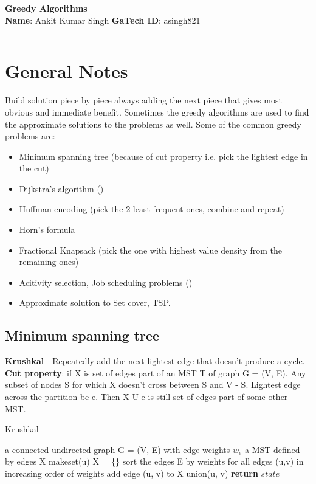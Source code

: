 \documentclass[11pt,letterpaper]{article}
\begin{document}
\pagestyle{plain}
 
\begin{center}
\textbf{\large Greedy Algorithms}\\
\textbf{Name}: Ankit Kumar Singh
\hspace{8cm}
\textbf{GaTech ID}: asingh821
\end{center}
\hrule

\section{General Notes}
Build solution piece by piece always adding the next piece that gives most obvious and immediate benefit. Sometimes the greedy algorithms are used to find the approximate solutions to the problems as well. Some of the common greedy problems are:
\begin{itemize}
	\item Minimum spanning tree (because of cut property i.e. pick the lightest edge in the cut)
	\item Dijkstra's algorithm ()
	\item Huffman encoding (pick the 2 least frequent ones, combine and repeat)
	\item Horn's formula
	\item Fractional Knapsack (pick the one with highest value density from the remaining ones)
	\item Acitivity selection, Job scheduling problems ()
	\item Approximate solution to Set cover, TSP. 
\end{itemize}

\subsection{Minimum spanning tree}

\textbf{Krushkal} - Repeatedly add the next lightest edge that doesn't produce a cycle.
\newline
\textbf{Cut property}: if X is set of edges part of an MST T of graph G = (V, E). Any subset of nodes S for which X doesn't cross between S and V - S. Lightest edge across the partition be e. Then X U {e} is still set of edges part of some other MST. 

\begin{algorithm}
	\algrenewcommand{}
	\algrenewcommand{}
	\caption{Krushkal}
	\label{alg: Krushkal's Minimum spanning tree}
	\begin{algorithmic}[1]
		\Require a connected undirected graph G = (V, E) with edge weights $w_{e}$
		\Ensure a MST defined by edges X
			\State makeset(u)
		\EndFor
		\State X = \{\}
		\State sort the edges E by weights
		\State for all edges (u,v) in increasing order of weights
			\State add edge (u, v) to X
			\State union(u, v)
		\EndIf
		\State \textbf{return} $state$
	\end{algorithmic}
\end{algorithm}
\end{document}
